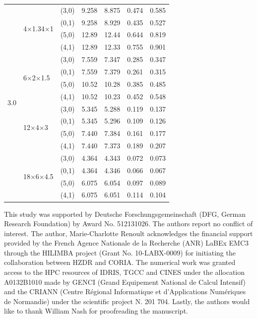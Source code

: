 \documentclass[aps,prfluids,reprint,superscriptaddress]{revtex4-2}
\begin{document}
\begin{table}
\begin{ruledtabular}
\begin{tabular}{lllllll}
			\hline
			\multirow{16}{*}{3.0} & \multirow{4}{*}{4$\times$1.34$\times$1} & (3,0) &
			9.258 & 8.875 & 0.474   & 0.585         \\
			& & (0,1) & 
			9.258 & 8.929 & 0.435   & 0.527         \\
			& & (5,0) & 
			12.89 & 12.44 &0.644   & 0.819          \\
			& & (4,1) & 
			12.89 & 12.33 & 0.755   & 0.901         \\
			\cline{2-7} 
			& \multirow{4}{*}{6$\times$2$\times$1.5} & (3,0) & 
			7.559 & 7.347 & 0.285   & 0.347         \\
			& & (0,1) & 
			7.559 & 7.379 & 0.261   & 0.315         \\
			& & (5,0) & 
			10.52 & 10.28 & 0.385   & 0.485          \\
			& & (4,1) & 
			10.52 & 10.23 & 0.452   & 0.548        \\
			\cline{2-7} 
			& \multirow{4}{*}{12$\times$4$\times$3} & (3,0) & 
			5.345 & 5.288 & 0.119   & 0.137         \\
			& & (0,1) & 
			5.345 & 5.296 & 0.109   & 0.126         \\
			& & (5,0) & 
			7.440 & 7.384 & 0.161   & 0.177          \\
			& & (4,1) & 
			7.440 & 7.373 & 0.189   & 0.207         \\
			\cline{2-7} 
			& \multirow{4}{*}{18$\times$6$\times$4.5} & (3,0) & 
			4.364 & 4.343 & 0.072   & 0.073         \\
			& & (0,1) & 
			4.364 & 4.346 & 0.066   & 0.067         \\
			& & (5,0) & 
			6.075 & 6.054 & 0.097   & 0.089        \\
			& & (4,1) & 
			6.075 & 6.051 & 0.114   & 0.104          
		\end{tabular}
	\end{ruledtabular}
\end{table}


\begin{acknowledgments}
This study was supported by Deutsche Forschungsgemeinschaft (DFG, German Research Foundation) by Award No. 512131026. The authors report no conflict of interest. The author, Marie-Charlotte Renoult acknowledges the financial support provided by the French Agence Nationale de la Recherche (ANR) LaBEx EMC3 through the HILIMBA project (Grant No. 10-LABX-0009) for initiating the collaboration between HZDR and CORIA. The numerical work was granted access to the HPC resources of IDRIS, TGCC and CINES under the allocation A0132B1010 made by GENCI (Grand Equipement National de Calcul Intensif) and the CRIANN (Centre Régional Informatique et d’Applications Numériques de Normandie) under the scientific project N. 201 704. Lastly, the authors would like to thank William Nash for proofreading the manuscript.
\end{acknowledgments}



\end{document}

